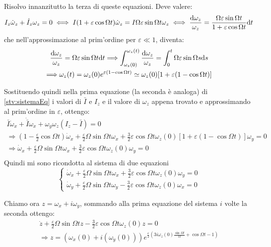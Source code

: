 \documentclass[../main.tex]{subfiles}
\begin{document}
Risolvo innanzitutto la terza di queste equazioni. Deve valere:
\begin{equation*}
	I_z\dot\omega_z+\dot I_z\omega_z=0 \iff I(1+\varepsilon \cos\Omega t)\dot\omega_z=I\Omega\varepsilon\sin\Omega t \omega_z \iff 
	\frac{\mathrm{d} \omega_z}{\omega_z}=\frac{\Omega\varepsilon\sin\Omega t}{1+\varepsilon \cos\Omega t}\mathrm{d} t
\end{equation*}
che nell'approssimazione al prim'ordine per $\varepsilon \ll 1$, diventa:
\begin{gather*}
	\frac{\mathrm{d} \omega_z}{\omega_z}=\Omega\varepsilon\sin\Omega t\mathrm{d} t \Longrightarrow 
	\int_{\omega_z(0)}^{\omega_z(t)}\frac{\mathrm{d} \omega_z}{\omega_z}=\int_0^t \Omega\varepsilon\sin\Omega s\mathrm{d} s\\
	\Longrightarrow \omega_z(t)=\omega_z(0)e^{\varepsilon(1-\cos\Omega t)}\simeq \omega_z(0)[1+\varepsilon(1-\cos\Omega t)]
\end{gather*}

Sostituendo quindi nella prima equazione (la seconda è analoga) di \cref{stv:sistemaEq} i valori di $\bar I$ e $I_z$ e il valore di $\omega_z$ appena trovato e approssimando al prim'ordine in $\varepsilon$, ottengo:
\begin{gather*}
	\bar I\dot\omega_x+\dot {\bar I}\omega_x+\omega_y\omega_z(I_z-\bar I)=0 \\
	\Longrightarrow (1-\frac \varepsilon 2\cos\Omega t) \dot\omega_x+\frac{\varepsilon}2 \Omega \sin\Omega t \omega_x + \frac 32 \varepsilon\cos\Omega t \omega_z(0)[1+\varepsilon(1-\cos\Omega t)] \omega_y=0\\
	\Longrightarrow \dot\omega_x+\frac{\varepsilon}2 \Omega \sin\Omega t \omega_x + \frac 32 \varepsilon\cos\Omega t \omega_z(0)\omega_y=0\\
\end{gather*}
Quindi mi sono ricondotta al sistema di due equazioni
\begin{equation*}
	\begin{cases}
		\dot\omega_x+\frac{\varepsilon}2 \Omega \sin\Omega t \omega_x + \frac 32 \varepsilon\cos\Omega t \omega_z(0)\omega_y=0\\
		\dot\omega_y+\frac{\varepsilon}2 \Omega \sin\Omega t \omega_y - \frac 32 \varepsilon\cos\Omega t \omega_z(0)\omega_x=0
	\end{cases}
\end{equation*}

Chiamo ora $z=\omega_x+i \omega_y$, sommando alla prima equazione del sistema $i$ volte la seconda ottengo:
\begin{gather*}
	\dot z+\frac{\varepsilon}2 \Omega \sin\Omega t z - \frac 32 \varepsilon\cos\Omega t \omega_z(0)z=0\\
	\Longrightarrow z=(\omega_x(0)+i(\omega_y(0)))e^{\frac\varepsilon 2 (3i\omega_z(0)\frac{\sin\Omega t}{\Omega}+\cos\Omega t -1)}
\end{gather*}
\end{document}
